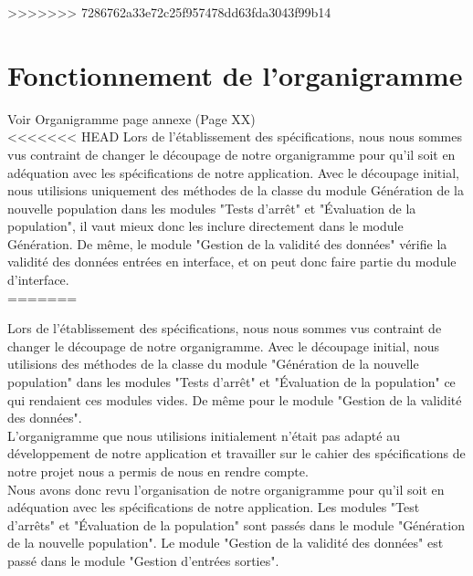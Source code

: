 \documentclass[a4paper,11pt]{article}
\begin{document}
>>>>>>> 7286762a33e72c25f957478dd63fda3043f99b14


	\section{Fonctionnement de l'organigramme}
		Voir Organigramme page annexe (Page XX)\\
<<<<<<< HEAD
		Lors de l'établissement des spécifications, nous nous sommes vus contraint de changer le découpage de notre organigramme pour qu’il soit en adéquation avec les spécifications de notre application. 
		Avec le découpage initial, nous utilisions uniquement des méthodes de la classe du module Génération de la nouvelle population dans les modules "Tests d’arrêt" et "Évaluation de la population", il vaut mieux donc les inclure directement dans le module Génération.
		De même, le module "Gestion de la validité des données" vérifie la validité des données entrées en interface, et on peut donc faire partie du module d'interface.\\
=======

		Lors de l'établissement des spécifications, nous nous sommes vus contraint de changer le découpage de notre organigramme.
		Avec le découpage initial, nous utilisions des méthodes de la classe du module "Génération de la nouvelle population" dans les modules "Tests d’arrêt" et "Évaluation de la population" ce qui rendaient ces modules vides.
		De même pour le module "Gestion de la validité des données".\\
		L’organigramme que nous utilisions initialement n’était pas adapté au développement de notre application et travailler sur le cahier des spécifications de notre projet nous a permis de nous en rendre compte.\\
		Nous avons donc revu l’organisation de notre organigramme pour qu’il soit en adéquation avec les spécifications de notre application. 
		Les modules "Test d’arrêts" et "Évaluation de la population" sont passés dans le module "Génération de la nouvelle population". Le module "Gestion de la validité des données" est passé dans le module "Gestion d'entrées sorties".\\
\end{document}

